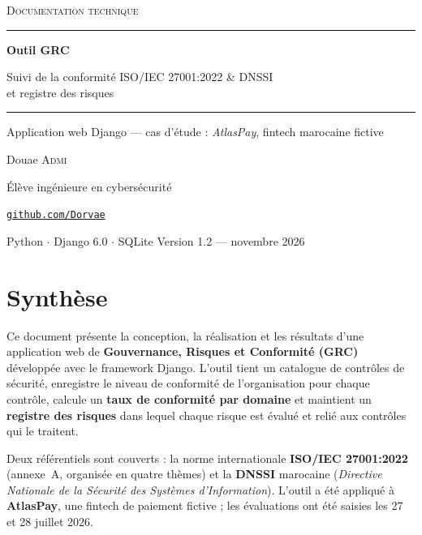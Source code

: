 \documentclass[11pt,a4paper]{article}
\begin{document}
\begin{titlepage}
\centering
\vspace*{2.5cm}
{\scshape\large Documentation technique\par}
\vspace{1.2cm}
\rule{\linewidth}{0.8pt}\par\vspace{0.4cm}
{\Huge\bfseries Outil GRC\par}
\vspace{0.4cm}
{\Large Suivi de la conformité ISO/IEC 27001:2022 \& DNSSI\\ et registre des risques\par}
\vspace{0.3cm}
\rule{\linewidth}{0.8pt}\par
\vspace{1cm}
{\large Application web Django --- cas d'étude : \emph{AtlasPay}, fintech marocaine fictive\par}
\vfill
{\Large Douae \textsc{Admi}\par}
\vspace{0.2cm}
{Élève ingénieure en cybersécurité\par}
\href{https://github.com/Dorvae}{\texttt{github.com/Dorvae}}\par
\vspace{1.5cm}
{\small Python $\cdot$ Django 6.0 $\cdot$ SQLite \hfill Version 1.2 --- novembre 2026\par}
\end{titlepage}

\tableofcontents
\newpage

\section{Synthèse}
Ce document présente la conception, la réalisation et les résultats d'une application web de \textbf{Gouvernance, Risques et Conformité (GRC)} développée avec le framework Django. L'outil tient un catalogue de contrôles de sécurité, enregistre le niveau de conformité de l'organisation pour chaque contrôle, calcule un \textbf{taux de conformité par domaine} et maintient un \textbf{registre des risques} dans lequel chaque risque est évalué et relié aux contrôles qui le traitent.

Deux référentiels sont couverts : la norme internationale \textbf{ISO/IEC 27001:2022} (annexe~A, organisée en quatre thèmes) et la \textbf{DNSSI} marocaine (\emph{Directive Nationale de la Sécurité des Systèmes d'Information}). L'outil a été appliqué à \textbf{AtlasPay}, une fintech de paiement fictive ; les évaluations ont été saisies les 27 et 28 juillet 2026.
\end{document}

